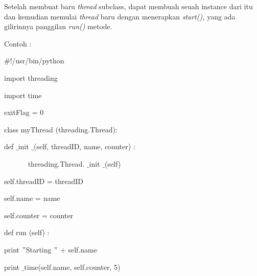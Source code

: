 \par
\noindent 




\newpage

\vspace{12pt}
Setelah membuat baru \textit{thread} subclass, dapat membuah seuah instance dari itu dan kemudian memulai \textit{thread} baru dengan menerapkan \textit{start(),} yang ada gilirinnya panggilan \textit{run()} metode. \par
\vspace{12pt}
	Contoh :
\par
\noindent 
{\fontsize{10pt}{10pt}\selectfont  $  \#  $!/usr/bin/python} \par
\vspace{10pt}
\noindent 
{\fontsize{10pt}{10pt}\selectfont import threading} \par
\noindent 
{\fontsize{10pt}{10pt}\selectfont import time} \par
\vspace{10pt}
\noindent 
{\fontsize{10pt}{10pt}\selectfont exitFlag = 0} \par
\vspace{10pt}
\noindent 
{\fontsize{10pt}{10pt}\selectfont class myThread (threading.Thread):} \par
\noindent 
{\fontsize{10pt}{10pt}\selectfont  \hspace*{0.5in} def $  \_  $init $  \_  $(self, threadID, name, counter) :} \par
\noindent 
{\fontsize{10pt}{10pt}\selectfont ~~~~~~ threading.Thread. $  \_  $init $  \_  $(self)} \par
\noindent 
{\fontsize{10pt}{10pt}\selectfont  \hspace*{0.5in} self.threadID = threadID} \par
\noindent 
{\fontsize{10pt}{10pt}\selectfont  \hspace*{0.5in} self.name = name} \par
\noindent 
{\fontsize{9pt}{9pt}\selectfont self.counter = counter} \par
\noindent 
{\fontsize{9pt}{9pt}\selectfont def run (self) :} \par
\noindent 
{\fontsize{9pt}{9pt}\selectfont  \hspace*{0.5in} print  $ " $Starting  $ " $ + self.name} \par
\noindent 
{\fontsize{9pt}{9pt}\selectfont  \hspace*{0.5in} print $  \_  $time(self.name, self.counter, 5)} \par
